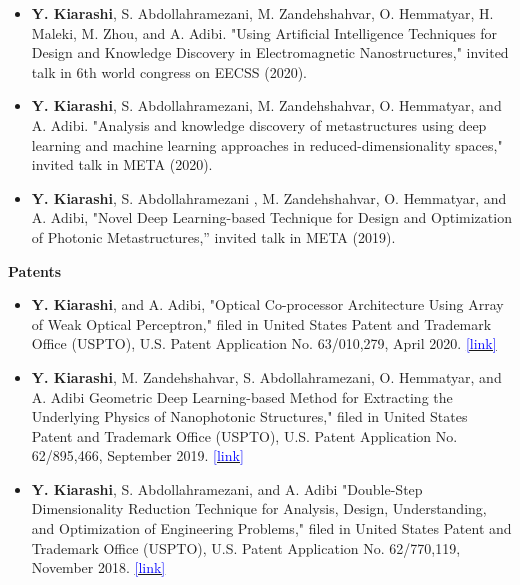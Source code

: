 \documentclass[margin, line]{res}
\newenvironment{list1}{
  \begin{list}{\ding{113}}{%
      \setlength{\itemsep}{0in}
      \setlength{\parsep}{0in} \setlength{\parskip}{0in}
      \setlength{\topsep}{0in} \setlength{\partopsep}{0in} 
      \setlength{\leftmargin}{0.17in}}}{\end{list}}
\begin{document}
\begin{resume}
\begin{list1}
\begin{itemize}
\item [] \textbf{Y. Kiarashi}, S. Abdollahramezani, M. Zandehshahvar, O. Hemmatyar, H. Maleki, M. Zhou, and A. Adibi. "Using Artificial Intelligence Techniques for Design and Knowledge Discovery in Electromagnetic Nanostructures," invited talk in 6th world congress on EECSS (2020).
\item [] \textbf{Y. Kiarashi}, S. Abdollahramezani, M. Zandehshahvar, O. Hemmatyar, and A. Adibi. "Analysis and knowledge discovery of metastructures using deep learning and machine learning approaches in reduced-dimensionality spaces," invited talk in META (2020).
\item [] \textbf{Y. Kiarashi}, S. Abdollahramezani , M. Zandehshahvar, O. Hemmatyar, and A. Adibi, "Novel Deep Learning-based Technique for Design and Optimization of Photonic Metastructures,” invited talk in META (2019).
\end{itemize}
\end{list1}



\begin{list1}
\item[] \textbf{Patents}
\begin{itemize}

\item[] \hspace{-0.5cm} \textbf{Y. Kiarashi}, and A. Adibi, "Optical Co-processor Architecture Using Array of Weak Optical Perceptron," filed in United States Patent and Trademark Office (USPTO), U.S.
Patent Application No. 63/010,279, April 2020. \href{https://patents.google.com/patent/US20230237015A1/en}{{\textcolor{blue}{[link]}}}


\item[] \hspace{-0.5cm} \textbf{Y. Kiarashi}, M. Zandehshahvar, S. Abdollahramezani, O. Hemmatyar, and A. Adibi Geometric Deep Learning-based Method for Extracting the Underlying Physics of Nanophotonic Structures," filed in United States Patent and Trademark Office (USPTO), U.S. 
Patent Application No. 62/895,466, September 2019. \href{https://patents.google.com/patent/US20220391708A1/en}{{\textcolor{blue}{[link]}}} 

\item[] \hspace{-0.5cm} \textbf{Y. Kiarashi}, S. Abdollahramezani, and A. Adibi "Double-Step Dimensionality Reduction Technique for Analysis, Design, Understanding, and Optimization of Engineering Problems," filed in United States Patent and Trademark Office (USPTO), U.S.
Patent Application No. 62/770,119, November 2018. \href{https://patents.google.com/patent/US20220019716A1/en}{{\textcolor{blue}{[link]}}}
\end{itemize}
\end{list1}


\end{resume}
\end{document}
